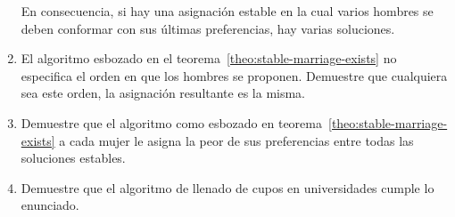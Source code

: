 \begin{enumerate}
    En consecuencia,
    si hay una asignación estable en la cual varios hombres
    se deben conformar con sus últimas preferencias,
    hay varias soluciones.
  \item
    El algoritmo esbozado en el teorema~\ref{theo:stable-marriage-exists}
    no especifica el orden en que los hombres se proponen.
    Demuestre que cualquiera sea este orden,
    la asignación resultante es la misma.
  \item
    Demuestre que el algoritmo
    como esbozado en teorema~\ref{theo:stable-marriage-exists}
    a cada mujer le asigna la peor de sus preferencias
    entre todas las soluciones estables.
  \item
    Demuestre que el algoritmo de llenado de cupos en universidades
    cumple lo enunciado.
  \end{enumerate}






